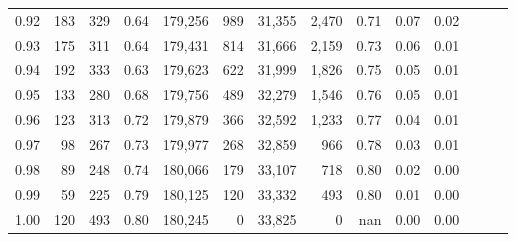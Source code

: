\begin{tabular}{rrrrrrrrrrrrrr}
0.92 &    183 &  329 &  0.64 &  179,256 &      989 &  31,355 &   2,470 &  0.71 &  0.07 &      0.02 \\
0.93 &    175 &  311 &  0.64 &  179,431 &      814 &  31,666 &   2,159 &  0.73 &  0.06 &      0.01 \\
0.94 &    192 &  333 &  0.63 &  179,623 &      622 &  31,999 &   1,826 &  0.75 &  0.05 &      0.01 \\
0.95 &    133 &  280 &  0.68 &  179,756 &      489 &  32,279 &   1,546 &  0.76 &  0.05 &      0.01 \\
0.96 &    123 &  313 &  0.72 &  179,879 &      366 &  32,592 &   1,233 &  0.77 &  0.04 &      0.01 \\
0.97 &     98 &  267 &  0.73 &  179,977 &      268 &  32,859 &     966 &  0.78 &  0.03 &      0.01 \\
0.98 &     89 &  248 &  0.74 &  180,066 &      179 &  33,107 &     718 &  0.80 &  0.02 &      0.00 \\
0.99 &     59 &  225 &  0.79 &  180,125 &      120 &  33,332 &     493 &  0.80 &  0.01 &      0.00 \\
1.00 &    120 &  493 &  0.80 &  180,245 &        0 &  33,825 &       0 &   nan &  0.00 &      0.00 \\
\bottomrule
\end{tabular}
